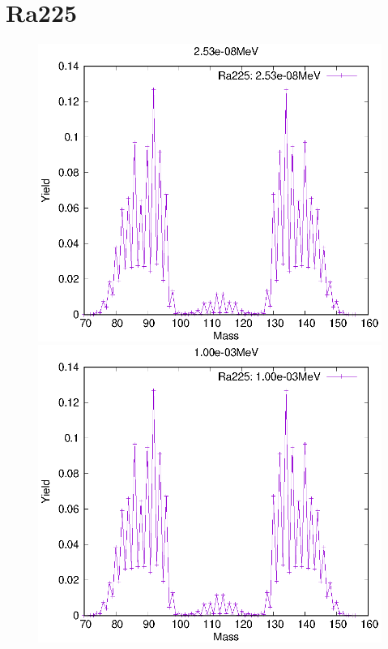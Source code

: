 \section{Ra225}
\begin{figure}[htbp]
 \begin{minipage}{0.33\textwidth} \begin{center} \includegraphics[width=\textwidth]{YA/Ra225_2.53e-08.eps} \end{center} \end{minipage}
\begin{minipage}{0.33\textwidth} \begin{center} \includegraphics[width=\textwidth]{YA/Ra225_1.00e-03.eps} \end{center} \end{minipage}

\end{figure}
